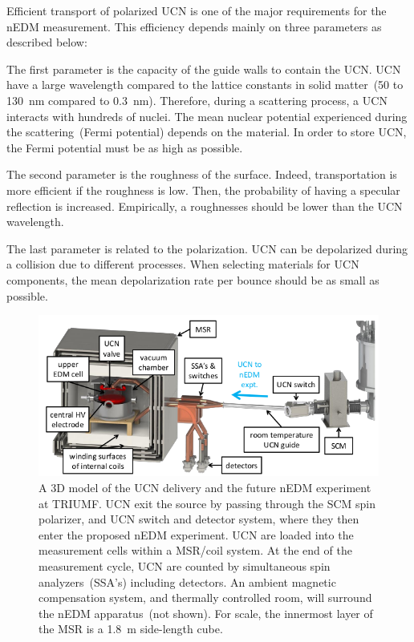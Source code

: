 Efficient transport of polarized UCN is one of the major requirements
for the nEDM measurement. This efficiency depends mainly
on three parameters as described below:

The first parameter is the capacity of the guide walls to contain the
UCN. UCN have a large wavelength compared to the lattice constants in
solid matter~(50 to 130~nm compared to 0.3~nm). Therefore, during a
scattering process, a UCN interacts with hundreds of nuclei. The mean
nuclear potential experienced during the scattering~(Fermi potential)
depends on the material. In order to store UCN, the Fermi potential
must be as high as possible.

The second parameter is the roughness of the surface. Indeed,
transportation is more efficient if the roughness is low. Then, the
probability of having a specular reflection is increased. Empirically,
a roughnesses should be lower than the UCN wavelength.

The last parameter is related to the polarization. UCN can be
depolarized during a collision due to different processes.
When selecting materials for UCN components, the mean depolarization
rate per bounce should be as small as possible.
\begin{figure}[h!]
  \centering
  \includegraphics[width=1.0\textwidth]{UCNdelivery.png}
  \caption{A 3D model of the UCN delivery and the future nEDM
    experiment at TRIUMF. UCN exit the source by passing through the
    SCM spin polarizer, and UCN switch and detector system, where they
    then enter the proposed nEDM experiment. UCN are loaded into the
    measurement cells within a MSR/coil system. At the end of the
    measurement cycle, UCN are counted by simultaneous spin
    analyzers~(SSA’s) including detectors. An ambient magnetic
    compensation system, and thermally controlled room, will
    surround the nEDM apparatus~(not shown). For scale, the innermost
    layer of the MSR is a 1.8~m side-length cube.}
  \label{fig:UCNdelivery}
\end{figure}



